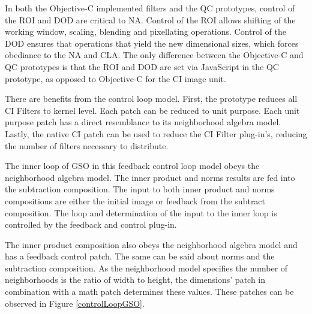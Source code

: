 \documentclass[11pt]{article}
\begin{document}
In both the Objective-C implemented filters and the QC prototypes, control of the ROI and DOD are critical to NA.   Control of the ROI allows shifting of the working window, scaling, blending and pixellating operations.  Control of the DOD ensures that operations that yield the new dimensional sizes, which forces obediance to the NA and CLA.   The only difference between the Objective-C and QC prototypes is that the ROI and DOD are set via  JavaScript in the QC prototype, as opposed to Objective-C for the CI image unit.   
	
	There are benefits from the control loop model. First, the prototype reduces all CI Filters to kernel level.  Each patch can be reduced to unit purpose. Each unit purpose patch has a direct resemblance to its neighborhood algebra model. Lastly, the native CI patch can be used to reduce the CI Filter plug-in's, reducing the number of filters necessary to distribute.  

	The inner loop of GSO in this feedback control loop model obeys the neighborhood algebra model.  The inner product and norms results are fed into the subtraction composition.  The input to both inner product and norms compositions are either the initial image or feedback from the subtract composition.  The loop and determination of the input to the inner loop is controlled by the feedback and control plug-in.  

	The inner product composition also obeys the neighborhood algebra model and has a feedback control patch.  The same can be said about norms and the subtraction composition.  As the neighborhood model specifies the number of neighborhoods is the ratio of width to height, the dimensions' patch in combination with a math patch determines these values.   These patches can be observed in Figure \ref{controlLoopGSO}.   
\end{document}
